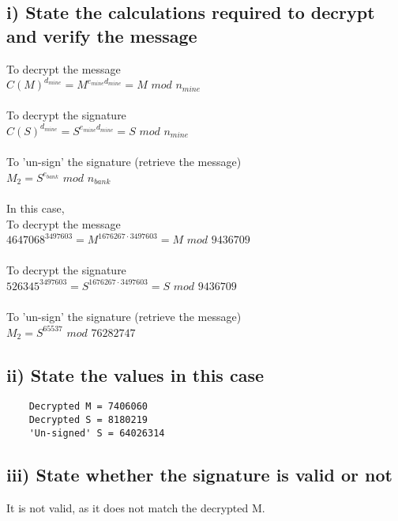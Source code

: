 \documentclass[a4paper,12pt]{article}
\begin{document}
\subsection*{i) State the calculations required to decrypt and verify the message}
To decrypt the message\\
$C(M)^{d_{mine}} = M^{e_{mine}d_{mine}} = M$ $mod$ $n_{mine}$\\\\
To decrypt the signature\\
$C(S)^{d_{mine}} = S^{e_{mine}d_{mine}} = S$ $mod$ $n_{mine}$\\\\
To 'un-sign' the signature (retrieve the message)\\
$M_2 = S^{e_{bank}}$ $mod$ $n_{bank}$\\\\
\newpage \noindent In this case,\\
To decrypt the message\\
$4647068^{3497603} = M^{1676267\cdot 3497603} = M$ $mod$ $9436709$\\\\
To decrypt the signature\\
$526345^{3497603} = S^{1676267\cdot 3497603} = S$ $mod$ $9436709$\\\\
To 'un-sign' the signature (retrieve the message)\\
$M_2 = S^{65537}$ $mod$ $76282747$

\subsection*{ii) State the values in this case}
\begin{verbatim}
    Decrypted M = 7406060
    Decrypted S = 8180219
    'Un-signed' S = 64026314
\end{verbatim}

\subsection*{iii) State whether the signature is valid or not}
It is not valid, as it does not match the decrypted M.
\end{document}
